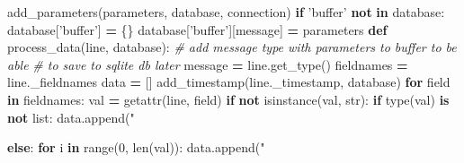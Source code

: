 \documentclass[12pt,oneside]{reedthesis}
\newenvironment{Shaded}{\begin{snugshade}}{\end{snugshade}}
\newcommand{\KeywordTok}[1]{\textcolor[rgb]{0.13,0.29,0.53}{\textbf{#1}}}
\newcommand{\DecValTok}[1]{\textcolor[rgb]{0.00,0.00,0.81}{#1}}
\newcommand{\SpecialCharTok}[1]{\textcolor[rgb]{0.00,0.00,0.00}{#1}}
\newcommand{\StringTok}[1]{\textcolor[rgb]{0.31,0.60,0.02}{#1}}
\newcommand{\CommentTok}[1]{\textcolor[rgb]{0.56,0.35,0.01}{\textit{#1}}}
\newcommand{\ControlFlowTok}[1]{\textcolor[rgb]{0.13,0.29,0.53}{\textbf{#1}}}
\newcommand{\OperatorTok}[1]{\textcolor[rgb]{0.81,0.36,0.00}{\textbf{#1}}}
\newcommand{\BuiltInTok}[1]{#1}
\newcommand{\NormalTok}[1]{#1}
\theoremstyle{definition}
\theoremstyle{definition}
\theoremstyle{definition}
\theoremstyle{remark}
\begin{document}
\begin{Shaded}
\begin{Highlighting}[]
{{{\NormalTok{    add_parameters(parameters, database, connection)}
    \ControlFlowTok{if} \StringTok{'buffer'} \KeywordTok{not} \KeywordTok{in}\NormalTok{ database:}
\NormalTok{        database[}\StringTok{'buffer'}\NormalTok{] }\OperatorTok{=}\NormalTok{ \{\}}
\NormalTok{    database[}\StringTok{'buffer'}\NormalTok{][message] }\OperatorTok{=}\NormalTok{ parameters}
\KeywordTok{def}\NormalTok{ process_data(line, database):        }
    \CommentTok{# add message type with parameters to buffer to be able }
    \CommentTok{# to save to sqlite db later}
\NormalTok{    message }\OperatorTok{=}\NormalTok{ line.get_type()}
\NormalTok{    fieldnames }\OperatorTok{=}\NormalTok{ line._fieldnames}
\NormalTok{    data }\OperatorTok{=}\NormalTok{ []}
\NormalTok{    add_timestamp(line._timestamp, database)}
    \ControlFlowTok{for}\NormalTok{ field }\KeywordTok{in}\NormalTok{ fieldnames:}
\NormalTok{        val }\OperatorTok{=} \BuiltInTok{getattr}\NormalTok{(line, field)}
        \ControlFlowTok{if} \KeywordTok{not} \BuiltInTok{isinstance}\NormalTok{(val, }\BuiltInTok{str}\NormalTok{):}
            \ControlFlowTok{if} \BuiltInTok{type}\NormalTok{(val) }\KeywordTok{is} \KeywordTok{not} \BuiltInTok{list}\NormalTok{:}
\NormalTok{                data.append(}\StringTok{"}\SpecialCharTok{%
            \ControlFlowTok{else}\NormalTok{:}
                \ControlFlowTok{for}\NormalTok{ i }\KeywordTok{in} \BuiltInTok{range}\NormalTok{(}\DecValTok{0}\NormalTok{, }\BuiltInTok{len}\NormalTok{(val)):}
\NormalTok{                    data.append(}\StringTok{"}\SpecialCharTok{%
    
}}}}}
\end{Highlighting}
\end{Shaded}
\end{document}
